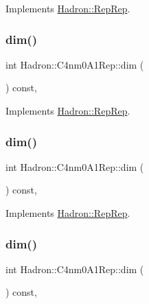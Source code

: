 Implements \mbox{\hyperlink{structHadron_1_1RepRep_a92c8802e5ed7afd7da43ccfd5b7cd92b}{Hadron\+::\+Rep\+Rep}}.

\mbox{\label{structHadron_1_1C4nm0A1Rep_a722d577aa4fe522bb25d0b7577e5dfbb}} 
\subsubsection{\texorpdfstring{dim()}{dim()}\hspace{0.1cm}{\footnotesize\ttfamily [3/5]}}
{\footnotesize\ttfamily int Hadron\+::\+C4nm0\+A1\+Rep\+::dim (\begin{DoxyParamCaption}{ }\end{DoxyParamCaption}) const\hspace{0.3cm}{\ttfamily [inline]}, {\ttfamily [virtual]}}



Implements \mbox{\hyperlink{structHadron_1_1RepRep_a92c8802e5ed7afd7da43ccfd5b7cd92b}{Hadron\+::\+Rep\+Rep}}.

\mbox{\label{structHadron_1_1C4nm0A1Rep_a722d577aa4fe522bb25d0b7577e5dfbb}} 
\subsubsection{\texorpdfstring{dim()}{dim()}\hspace{0.1cm}{\footnotesize\ttfamily [4/5]}}
{\footnotesize\ttfamily int Hadron\+::\+C4nm0\+A1\+Rep\+::dim (\begin{DoxyParamCaption}{ }\end{DoxyParamCaption}) const\hspace{0.3cm}{\ttfamily [inline]}, {\ttfamily [virtual]}}



Implements \mbox{\hyperlink{structHadron_1_1RepRep_a92c8802e5ed7afd7da43ccfd5b7cd92b}{Hadron\+::\+Rep\+Rep}}.

\mbox{\label{structHadron_1_1C4nm0A1Rep_a722d577aa4fe522bb25d0b7577e5dfbb}} 
\subsubsection{\texorpdfstring{dim()}{dim()}\hspace{0.1cm}{\footnotesize\ttfamily [5/5]}}
{\footnotesize\ttfamily int Hadron\+::\+C4nm0\+A1\+Rep\+::dim (\begin{DoxyParamCaption}{ }\end{DoxyParamCaption}) const\hspace{0.3cm}{\ttfamily [inline]}, {\ttfamily [virtual]}}



